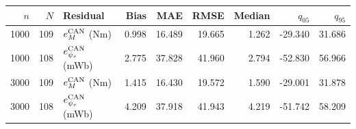 \begin{tabular}{rrlrrrrrr}
\toprule
$n$ & $N$ & Residual & Bias & MAE & RMSE & Median & $q_{05}$ & $q_{95}$\\
\midrule
1000 & 109 & $e_M^{\rm CAN}$ (Nm) & 0.998 & 16.489 & 19.665 & 1.262 & -29.340 & 31.686\\
1000 & 108 & $e_{\psi_\tau}^{\rm CAN}$ (mWb) & 2.775 & 37.828 & 41.960 & 2.794 & -52.830 & 56.966\\
3000 & 109 & $e_M^{\rm CAN}$ (Nm) & 1.415 & 16.430 & 19.572 & 1.590 & -29.001 & 31.878\\
3000 & 108 & $e_{\psi_\tau}^{\rm CAN}$ (mWb) & 4.209 & 37.918 & 41.943 & 4.219 & -51.742 & 58.209\\
\bottomrule
\end{tabular}
